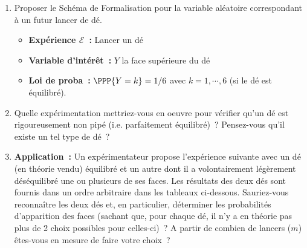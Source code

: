 \documentclass[10pt]{report}
\begin{document}
\begin{exercice}[Lancer d'un dé] ${ }$\label{ex:des}

\begin{enumerate}
\item Proposer le Schéma de Formalisation pour la variable aléatoire correspondant à un futur lancer de dé.\\
\begin{Correction}
\begin{itemize}
\item \textbf{Expérience $\mathcal{E}$~:} Lancer un dé
\item \textbf{Variable d'intérêt~:} $Y$ la face supérieure du dé
\item \textbf{Loi de proba~:} $\PPP{Y=k}=1/6$ avec $k=1,\cdots,6$ (si le dé est équilibré).
\end{itemize}
\end{Correction} 

\item Quelle expérimentation mettriez-vous en oeuvre pour vérifier qu'un dé est rigoureusement non pipé (i.e. parfaitement équilibré)~? Pensez-vous qu'il existe un tel type de dé~?

\item \textbf{Application~:} Un expérimentateur propose l'expérience suivante avec un dé (en théorie vendu) équilibré et un autre dont il a volontairement légèrement déséquilibré une ou plusieurs de ses faces. Les résultats des deux dés sont fournis dans un ordre arbitraire dans les tableaux ci-dessous. Sauriez-vous reconnaître les deux dés et, en particulier, déterminer les probabilités d'apparition des faces (sachant que, pour chaque dé, il n'y a en théorie pas plus de 2 choix possibles pour celles-ci)~? A partir de combien de lancers ($m$) êtes-vous en mesure de faire votre choix~?


\end{enumerate}
\end{exercice}
\end{document}
